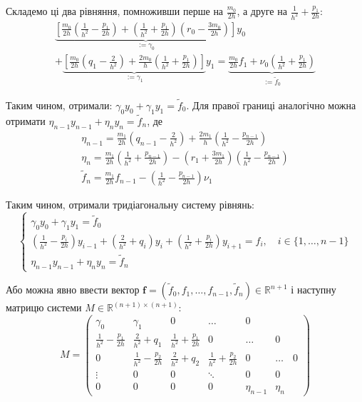 \documentclass{test_template}
\begin{document}
Складемо ці два рівняння, помноживши перше на $\frac{m_0}{2h}$, а 
друге на $\frac{1}{h^2} + \frac{p_1}{2h}$:
\begin{gather*}
    \underbrace{\left[\frac{m_0}{2h}\left(\frac{1}{h^2} - \frac{p_1}{2h}\right) + \left(\frac{1}{h^2} + \frac{p_1}{2h}\right)\left(r_0 - \frac{3m_0}{2h}\right)\right]}_{:=\gamma_0}y_0  \\
    + \underbrace{\left[\frac{m_0}{2h}\left(q_1-\frac{2}{h^2}\right) + \frac{2m_0}{h}\left(\frac{1}{h^2} + \frac{p_1}{2h}\right)\right]}_{:=\gamma_1}y_1 = \underbrace{\frac{m_0}{2h}f_1 + \nu_0\left(\frac{1}{h^2} + \frac{p_1}{2h}\right)}_{:=\widetilde{f}_0}
\end{gather*}

Таким чином, отримали: $\gamma_0y_0 + \gamma_1y_1 = \widetilde{f}_0$. Для правої
границі аналогічно можна отримати $\eta_{n-1}y_{n-1}+\eta_ny_n =
\widetilde{f}_n$, де
\begin{gather*}
    \eta_{n-1} = \frac{m_1}{2h}\left(q_{n-1}-\frac{2}{h^2}\right) + \frac{2m_1}{h}\left(\frac{1}{h^2} - \frac{p_{n-1}}{2h}\right) \\
    \eta_n = \frac{m_1}{2h}\left(\frac{1}{h^2}+\frac{p_{n-1}}{2h}\right) - \left(r_1+\frac{3m_1}{2h}\right)\left(\frac{1}{h^2} - \frac{p_{n-1}}{2h}\right) \\
    \widetilde{f}_n = \frac{m_1}{2h}f_{n-1} -
\left(\frac{1}{h^2} - \frac{p_{n-1}}{2h}\right)\nu_1
\end{gather*}

Таким чином, отримали тридіагональну систему рівнянь:
\begin{equation*}
    \begin{cases}
        \gamma_0y_0 + \gamma_1y_1 = \widetilde{f}_0 \\
        \left(\frac{1}{h^2} - \frac{p_i}{2h}\right)y_{i-1} + \left(\frac{2}{h^2} + q_i\right)y_i + \left(\frac{1}{h^2} + \frac{p_i}{2h}\right)y_{i+1} = f_i, \quad i \in \{1,\dots,n-1\} \\
        \eta_{n-1}y_{n-1} + \eta_ny_n = \widetilde{f}_n
    \end{cases}
\end{equation*}

Або можна явно ввести вектор $\boldsymbol{f} = (\widetilde{f}_0,f_1,\dots,f_{n-1},\widetilde{f}_n) \in \mathbb{R}^{n+1}$ 
і наступну матрицю системи $M \in \mathbb{R}^{(n+1)\times(n+1)}$:
\begin{equation*}
    M = \begin{pmatrix}
        \gamma_0 & \gamma_1 & 0 & \dots & 0 \\
        \frac{1}{h^2} - \frac{p_1}{2h} & \frac{2}{h^2} + q_1 & \frac{1}{h^2} + \frac{p_1}{2h} & 0 & \dots & 0 \\
        0 & \frac{1}{h^2} - \frac{p_2}{2h} & \frac{2}{h^2} + q_2 & \frac{1}{h^2} + \frac{p_2}{2h} & 0 & \dots & 0 \\
        \vdots & 0 & 0 & \ddots & 0 & 0 \\
        0 & 0 & 0 & 0 & \eta_{n-1} & \eta_n
    \end{pmatrix}
\end{equation*} 
\end{document}
